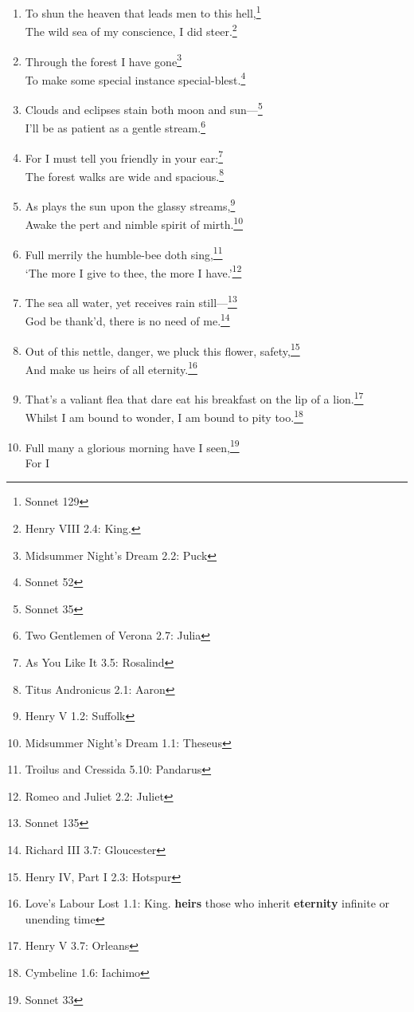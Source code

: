 \documentclass[17pt,twoside]{extarticle}
\begin{document}
\begin{enumerate}
  sigh not so, but let them go.\footnote{Much Ado About Nothing 2.3:
    Balthasar.}
\item
  To shun the heaven that leads men to this hell,\footnote{Sonnet 129}\\The
  wild sea of my conscience, I did steer.\footnote{Henry VIII 2.4: King.}
\item
  Through the forest I have gone\footnote{Midsummer Night's Dream 2.2:
    Puck}\\To make some special instance special-blest.\footnote{Sonnet
    52}
\item
  Clouds and eclipses stain both moon and sun---\footnote{Sonnet 35}\\I'll
  be as patient as a gentle stream.\footnote{Two Gentlemen of Verona
    2.7: Julia}
\item
  For I must tell you friendly in your ear:\footnote{As You Like It 3.5:
    Rosalind}\\The forest walks are wide and spacious.\footnote{Titus
    Andronicus 2.1: Aaron}
\item
  As plays the sun upon the glassy streams,\footnote{Henry V 1.2:
    Suffolk}\\Awake the pert and nimble spirit of mirth.\footnote{Midsummer
    Night's Dream 1.1: Theseus}
\item
  Full merrily the humble-bee doth sing,\footnote{Troilus and Cressida
    5.10: Pandarus}\\`The more I give to thee, the more I
  have.'\footnote{Romeo and Juliet 2.2: Juliet}
\item
  The sea all water, yet receives rain still---\footnote{Sonnet 135}\\God
  be thank'd, there is no need of me.\footnote{Richard III 3.7:
    Gloucester}
\item
  Out of this nettle, danger, we pluck this flower, safety,\footnote{Henry
    IV, Part I 2.3: Hotspur}\\And make us heirs of all
  eternity.\footnote{Love's Labour Lost 1.1: King. \textbf{heirs} those
    who inherit \textbf{eternity} infinite or unending time}
\item
  That's a valiant flea that dare eat his breakfast on the lip of a
  lion.\footnote{Henry V 3.7: Orleans}\\Whilst I am bound to wonder, I
  am bound to pity too.\footnote{Cymbeline 1.6: Iachimo}
\item
  Full many a glorious morning have I seen,\footnote{Sonnet 33}\\For I

\end{enumerate}
\end{document}
